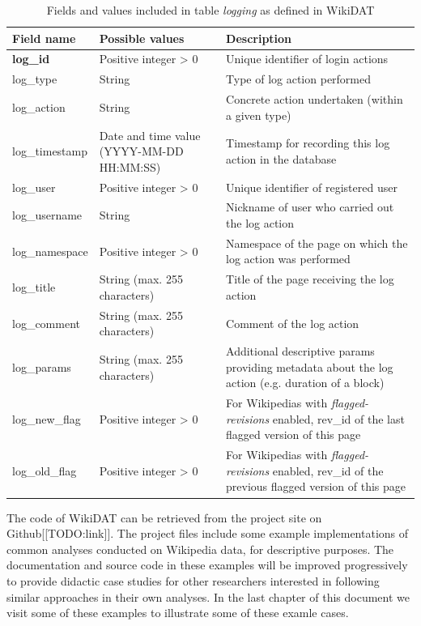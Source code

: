 \begin{longtable}[l]{|m{4.5cm}|m{5cm}|m{5cm}|}
 \caption[Table logging in WikiDAT]
  {Fields and values included in table \textit{logging} as defined in WikiDAT}
  \label{tab:table-logging}\\
  \hline
  {\bfseries Field name} & {\bfseries Possible values} & {\bfseries Description}\\
  \hline
  {\bfseries log\_id} & Positive integer > 0 & Unique identifier of login actions \\
  \hline
  log\_type & String & Type of log action performed \\
  \hline
  log\_action & String & Concrete action undertaken (within a given type) \\
  \hline
  log\_timestamp & Date and time value (YYYY-MM-DD HH:MM:SS) & Timestamp for recording
  this log action in the database \\
  \hline
  log\_user & Positive integer > 0 & Unique identifier of registered user \\
  \hline
  log\_username & String & Nickname of user who carried out the log action \\
  \hline
  log\_namespace & Positive integer > 0 & Namespace of the page on which the log
  action was performed \\
  \hline
  log\_title & String (max. 255 characters) & Title of the page receiving the log
  action \\
  \hline
  log\_comment & String (max. 255 characters) & Comment of the log action \\
  \hline
  log\_params & String (max. 255 characters) & Additional descriptive params
  providing metadata about the log action (e.g. duration of a block) \\
  \hline
  log\_new\_flag & Positive integer > 0 & For Wikipedias with \textit{flagged-revisions} 
  enabled, rev\_id of the last flagged version of this page\\
  \hline
  log\_old\_flag & Positive integer > 0 & For Wikipedias with \textit{flagged-revisions} 
  enabled, rev\_id of the previous flagged version of this page\\
  \hline
\end{longtable}

The code of WikiDAT can be retrieved from the project site on Github[[TODO:link]].
The project files include some example implementations of common
analyses conducted on Wikipedia data, for descriptive purposes. The documentation
and source code in these examples will be improved progressively to provide
didactic case studies for other researchers interested in following similar approaches
in their own analyses. In the last chapter of this document we visit some of
these examples to illustrate some of these examle cases.

